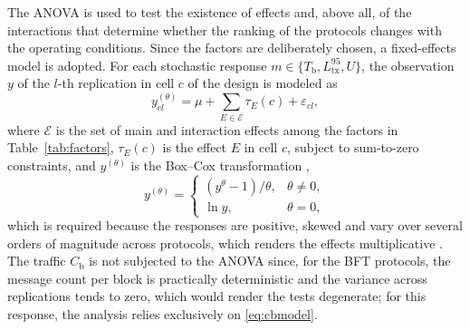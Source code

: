 \documentclass[english]{sbc2025}%
\newcommand{\Tb}{T_{\mathrm{b}}}
\newcommand{\Cb}{C_{\mathrm{b}}}
\newcommand{\Lt}{L^{95}_{\mathrm{tx}}}
\newcommand{\Ut}{U}
\begin{document}
The ANOVA is used to test the existence of effects and, above all, of the interactions that determine whether the ranking of the protocols changes with the operating conditions. Since the factors are deliberately chosen, a fixed-effects model is adopted. For each stochastic response $m \in \{\Tb, \Lt, \Ut\}$, the observation $y$ of the $l$-th replication in cell $c$ of the design is modeled as
\begin{equation}
y^{(\theta)}_{cl} = \mu + \sum_{E \in \mathcal{E}} \tau_{E}(c) + \varepsilon_{cl},
\label{eq:anova}
\end{equation}
where $\mathcal{E}$ is the set of main and interaction effects among the factors in Table~\ref{tab:factors}, $\tau_{E}(c)$ is the effect $E$ in cell $c$, subject to sum-to-zero constraints, and $y^{(\theta)}$ is the Box--Cox transformation \citep{BoxCox1964},
\begin{equation}
y^{(\theta)} = \begin{cases} (y^{\theta}-1)/\theta, & \theta \neq 0, \\ \ln y, & \theta = 0, \end{cases}
\label{eq:boxcox}
\end{equation}
which is required because the responses are positive, skewed and vary over several orders of magnitude across protocols, which renders the effects multiplicative \citep{Jain1991,Montgomery2017}. The traffic $\Cb$ is not subjected to the ANOVA since, for the BFT protocols, the message count per block is practically deterministic and the variance across replications tends to zero, which would render the tests degenerate; for this response, the analysis relies exclusively on \eqref{eq:cbmodel}.
\end{document}
